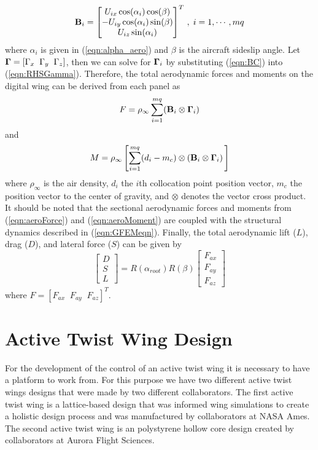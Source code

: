 \documentclass[11pt]{ucthesis}
\begin{document}
\begin{equation}
{\bf B}_{i} = \begin{bmatrix}U_{ix}\cos(\alpha_{i})\cos(\beta)\\ -U_{iy}\cos(\alpha_{i})\sin(\beta)\\ U_{iz}\sin(\alpha_{i})\end{bmatrix}^T \,,\;i=1,\cdots,mq
\label{eqn:BC}
\end{equation}
where $\alpha_i$ is given in (\ref{eqn:alpha_aero}) and $\beta$ is the aircraft sideslip angle. Let ${\bf \Gamma} = [\Gamma_x \;\; \Gamma_y \;\;\Gamma_z]$, then we can solve for ${\bf \Gamma}_i$ by substituting (\ref{eqn:BC}) into (\ref{eqn:RHSGamma}). Therefore, the total aerodynamic forces and moments on the digital wing can be derived from each panel as %
\begin{equation}
F = \rho_{\infty} \sum_{i=1}^{mq} ({\bf B}_i \otimes {\bf \Gamma}_i)
\label{eqn:aeroForce}
\end{equation}
and
\begin{equation}
M = \rho_{\infty} \left [ \sum_{i=1}^{mq} (d_i-m_c) \otimes ({\bf B}_i \otimes {\bf \Gamma}_i)\,\right ]
\label{eqn:aeroMoment}
\end{equation}
where $\rho_{\infty}$ is the air density, $d_i$ the $i$th collocation point position vector, $m_c$ the position vector to the center of gravity, and $\otimes$ denotes the vector cross product. It should be noted that the sectional aerodynamic forces and moments from (\ref{eqn:aeroForce}) and (\ref{eqn:aeroMoment}) are coupled with the structural dynamics described in (\ref{eqn:GFEMeqn}). Finally, the total aerodynamic lift ($L$), drag ($D$), and lateral force ($S$) can be given by 
\begin{equation}
\begin{bmatrix}D\\S\\L\end{bmatrix} = R(\alpha_{root})R(\beta)\begin{bmatrix}F_{ax}\\F_{ay}\\F_{az}\end{bmatrix}
\label{eqn:LDS}
\end{equation}
where $F = [F_{ax} \;\;F_{ay} \;\; F_{az}]^{T}$.   

\chapter{Active Twist Wing Design}
For the development of the control of an active twist wing it is necessary to have a platform to work from. For this purpose we have two different active twist wings designs that were made by two different collaborators. The first active twist wing is a lattice-based design that was informed wing simulations to create a holistic design process and was manufactured by collaborators at NASA Ames. The second active twist wing is an polystyrene hollow core design created by collaborators at Aurora Flight Sciences.
\end{document}
